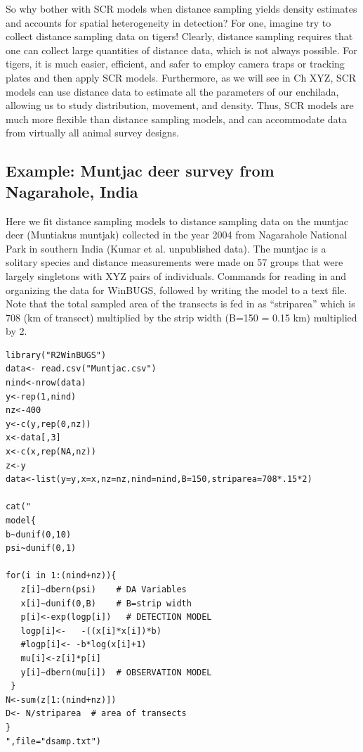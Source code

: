 So why bother with SCR models when distance sampling yields density estimates and accounts for spatial  heterogeneity in detection? For one, imagine try to collect distance sampling data on tigers! Clearly, distance sampling requires that one can collect large quantities of distance data, which is not always possible. For tigers, it is much easier, efficient, and safer to employ camera traps or tracking plates and then apply SCR models. Furthermore, as we will see in Ch XYZ, SCR models can use distance data to estimate all the parameters of our enchilada, allowing us to study distribution, movement, and density. Thus, SCR models are much more flexible than distance sampling models, and can accommodate data from virtually all animal survey designs.


\subsection{Example: Muntjac deer survey from Nagarahole, India }
Here we fit distance sampling models to distance sampling data on the muntjac deer (Muntiakus muntjak) collected in the year 2004 from Nagarahole National Park in southern India \citep{kumar_etal:XXXX}(Kumar et al. unpublished data). The muntjac is a solitary species and distance measurements were made on 57 groups that were largely singletons with XYZ pairs of individuals.  Commands for reading in and organizing the data for WinBUGS, followed by writing the model to a text file. Note that the total sampled area of the transects is fed in as ``striparea'' which is 708 (km of transect) multiplied by the strip width (B=150 = 0.15 km) multiplied by 2.
\begin{verbatim}
library("R2WinBUGS")
data<- read.csv("Muntjac.csv")
nind<-nrow(data)
y<-rep(1,nind)
nz<-400
y<-c(y,rep(0,nz))
x<-data[,3]
x<-c(x,rep(NA,nz))
z<-y
data<-list(y=y,x=x,nz=nz,nind=nind,B=150,striparea=708*.15*2)

cat("
model{
b~dunif(0,10)
psi~dunif(0,1)

for(i in 1:(nind+nz)){
   z[i]~dbern(psi)    # DA Variables
   x[i]~dunif(0,B)    # B=strip width
   p[i]<-exp(logp[i])   # DETECTION MODEL
   logp[i]<-   -((x[i]*x[i])*b)
   #logp[i]<- -b*log(x[i]+1)
   mu[i]<-z[i]*p[i]
   y[i]~dbern(mu[i])  # OBSERVATION MODEL
 }
N<-sum(z[1:(nind+nz)])
D<- N/striparea  # area of transects
}
",file="dsamp.txt")
\end{verbatim}

